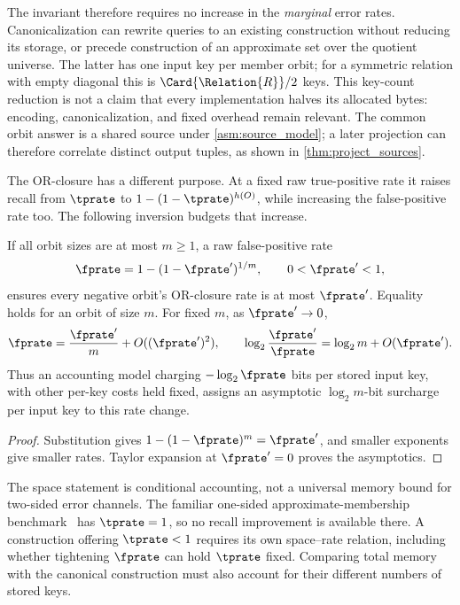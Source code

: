 \documentclass[ ../main.tex]{subfiles}
\begin{document}
The invariant therefore requires no increase in the \emph{marginal} error rates.
Canonicalization can rewrite queries to an existing construction without
reducing its storage, or precede construction of an approximate set over the
quotient universe. The latter has one input key per member orbit; for a
symmetric relation with empty diagonal this is $\Card{\Relation{R}}/2$ keys.
This key-count reduction is not a claim that every implementation halves its
allocated bytes: encoding, canonicalization, and fixed overhead remain relevant.
The common orbit answer is a shared source under \cref{asm:source_model}; a
later projection can therefore correlate distinct output tuples, as shown in
\cref{thm:project_sources}.

The OR-closure has a different purpose. At a fixed raw true-positive rate it
raises recall from $\tprate$ to $1-(1-\tprate)^{h(O)}$, while increasing the
false-positive rate too. The following inversion budgets that increase.

\begin{corollary}
\label{cor:invariant_space_cost}
If all orbit sizes are at most $m\ge1$, a raw false-positive rate
\begin{equation}
 \fprate=1-(1-\fprate')^{1/m},\qquad 0<\fprate'<1,
\end{equation}
ensures every negative orbit's OR-closure rate is at most $\fprate'$.
Equality holds for an orbit of size $m$. For fixed $m$, as $\fprate'\to0$,
\begin{equation}
 \fprate=\frac{\fprate'}m+O((\fprate')^2),\qquad
 \log_2\frac{\fprate'}{\fprate}=\log_2m+O(\fprate').
\end{equation}
Thus an accounting model charging $-\log_2\fprate$ bits per stored input key,
with other per-key costs held fixed, assigns an asymptotic $\log_2m$-bit
surcharge per input key to this rate change.
\end{corollary}
\begin{proof}
Substitution gives $1-(1-\fprate)^m=\fprate'$, and smaller exponents give
smaller rates. Taylor expansion at $\fprate'=0$ proves the asymptotics.
\end{proof}

The space statement is conditional accounting, not a universal memory bound
for two-sided error channels. The familiar one-sided approximate-membership
benchmark~\cite{bernoulliEntropy} has $\tprate=1$, so no recall improvement
is available there. A construction offering $\tprate<1$ requires its own
space--rate relation, including whether tightening $\fprate$ can hold
$\tprate$ fixed. Comparing total memory with the canonical construction must
also account for their different numbers of stored keys.
\end{document}
